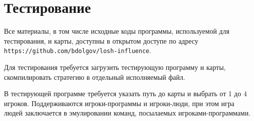 \documentclass[12pt, a4paper]{article}
\begin{document}
{\section{Тестирование}}

Все материалы, в том числе исходные коды программы, используемой для тестирования, и карты, доступны в открытом доступе по адресу
\texttt{https://github.com/bdolgov/losh-influence}.

Для тестирования требуется загрузить тестирующую программу и карты, скомпилировать стратегию в отдельный исполняемый файл.

В тестирующей программе требуется указать путь до карты и выбрать от 1 до 4 игроков. Поддерживаются игроки-программы и игроки-люди, при этом игра людей заключается в эмулировании команд, посылаемых игроками-программами.
\end{document}
